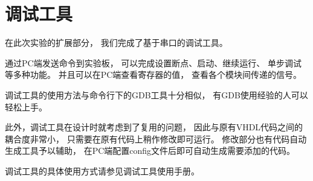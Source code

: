 \section{调试工具}
    在此次实验的扩展部分，
    我们完成了基于串口的调试工具。

    通过PC端发送命令到实验板，
    可以完成设置断点、启动、继续运行、
    单步调试等多种功能。
    并且可以在PC端查看寄存器的值，
    查看各个模块间传递的信号。

    调试工具的使用方法与命令行下的GDB工具十分相似，
    有GDB使用经验的人可以轻松上手。

    此外，调试工具在设计时就考虑到了复用的问题，
    因此与原有VHDL代码之间的耦合度非常小，
    只需要在原有代码上稍作修改即可运行。
    修改部分也有代码自动生成工具予以辅助，
    在PC端配置config文件后即可自动生成需要添加的代码。

    调试工具的具体使用方式请参见调试工具使用手册。